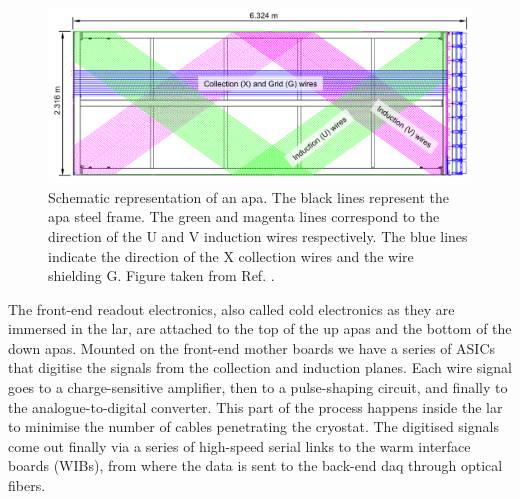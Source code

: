 \begin{figure}[t]
	\centering
	\includegraphics[width=1\linewidth]{Images/DUNE/FD/APA_wires}
	\caption[Schematic representation of an \gls{apa} frames showing the U, V, X and G wires.]{Schematic representation of an \gls{apa}. The black lines represent the \gls{apa} steel frame. The green and magenta lines correspond to the direction of the U and V induction wires respectively. The blue lines indicate the direction of the X collection wires and the wire shielding G. Figure taken from Ref. \cite{DUNE2020TDR1}.}
	\label{fig:apa}
\end{figure}

The front-end readout electronics, also called cold electronics as they are immersed in the \gls{lar}, are attached to the top of the up \gls{apa}s and the bottom of the down \gls{apa}s. Mounted on the front-end mother boards we have a series of ASICs that digitise the signals from the collection and induction planes. Each wire signal goes to a charge-sensitive amplifier, then to a pulse-shaping circuit, and finally to the analogue-to-digital converter. This part of the process happens inside the \gls{lar} to minimise the number of cables penetrating the cryostat. The digitised signals come out finally via a series of high-speed serial links to the warm interface boards (WIBs), from where the data is sent to the back-end \gls{daq} through optical fibers.

